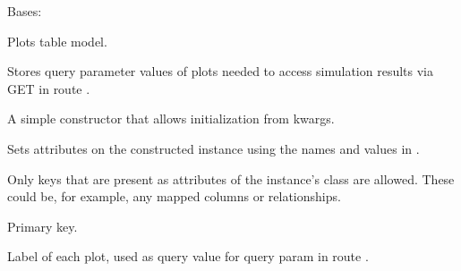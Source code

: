 \documentclass[a4paper,landscape,10pt,english]{sphinxmanual}
\begin{document}
\begin{fulllineitems}
\label{\detokenize{code_docs/simulation_api.model:simulation_api.model.models.PlotDB}}
Bases: 

Plots table model.

Stores query parameter values of plots needed to access simulation
results via GET in route
.

\begin{fulllineitems}
\label{\detokenize{code_docs/simulation_api.model:simulation_api.model.models.PlotDB.__init__}}
A simple constructor that allows initialization from kwargs.

Sets attributes on the constructed instance using the names and
values in .

Only keys that are present as
attributes of the instance’s class are allowed. These could be,
for example, any mapped columns or relationships.

\end{fulllineitems}


\begin{fulllineitems}
\label{\detokenize{code_docs/simulation_api.model:simulation_api.model.models.PlotDB.plot_id}}
Primary key.

\end{fulllineitems}


\begin{fulllineitems}
\label{\detokenize{code_docs/simulation_api.model:simulation_api.model.models.PlotDB.plot_query_value}}
Label of each plot, used as query value for query param  in
route .


\end{fulllineitems}
\end{fulllineitems}
\end{document}
